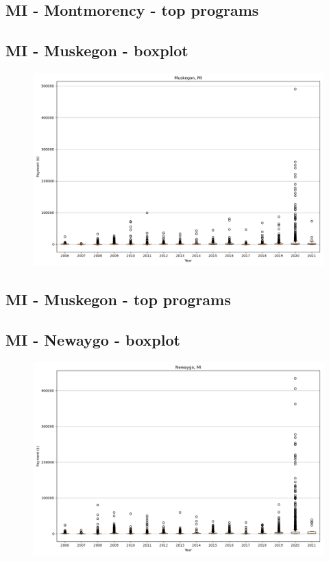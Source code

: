 \subsection*{MI - Montmorency - top programs}

\newpage
\subsection*{MI - Muskegon - boxplot}
\begin{figure}[h]
\centering
\includegraphics[width=7in]{../output/boxplots/counties/Muskegon-MI_boxplot.png}
\end{figure}


\subsection*{MI - Muskegon - top programs}

\newpage
\subsection*{MI - Newaygo - boxplot}
\begin{figure}[h]
\centering
\includegraphics[width=7in]{../output/boxplots/counties/Newaygo-MI_boxplot.png}
\end{figure}


